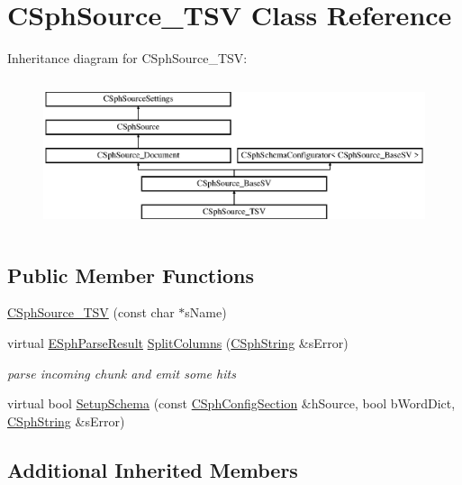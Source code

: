 \hypertarget{classCSphSource__TSV}{\section{C\-Sph\-Source\-\_\-\-T\-S\-V Class Reference}
\label{classCSphSource__TSV}
}
Inheritance diagram for C\-Sph\-Source\-\_\-\-T\-S\-V\-:\begin{figure}[H]
\begin{center}
\leavevmode
\includegraphics[height=4.444445cm]{classCSphSource__TSV}
\end{center}
\end{figure}
\subsection*{Public Member Functions}
\begin{DoxyCompactItemize}
\item 
\hyperlink{classCSphSource__TSV_ae1cda8aba12167f302e6b7869d887ddd}{C\-Sph\-Source\-\_\-\-T\-S\-V} (const char $\ast$s\-Name)
\item 
virtual \hyperlink{classCSphSource__BaseSV_aa78147110220c575814ba85191261524}{E\-Sph\-Parse\-Result} \hyperlink{classCSphSource__TSV_a6337b6f61f31610eb185615e726b75e6}{Split\-Columns} (\hyperlink{structCSphString}{C\-Sph\-String} \&s\-Error)
\begin{DoxyCompactList}\small\item\em parse incoming chunk and emit some hits \end{DoxyCompactList}\item 
virtual bool \hyperlink{classCSphSource__TSV_a368bacb4554087c44f385b4a986cf7c3}{Setup\-Schema} (const \hyperlink{classCSphConfigSection}{C\-Sph\-Config\-Section} \&h\-Source, bool b\-Word\-Dict, \hyperlink{structCSphString}{C\-Sph\-String} \&s\-Error)
\end{DoxyCompactItemize}
\subsection*{Additional Inherited Members}



